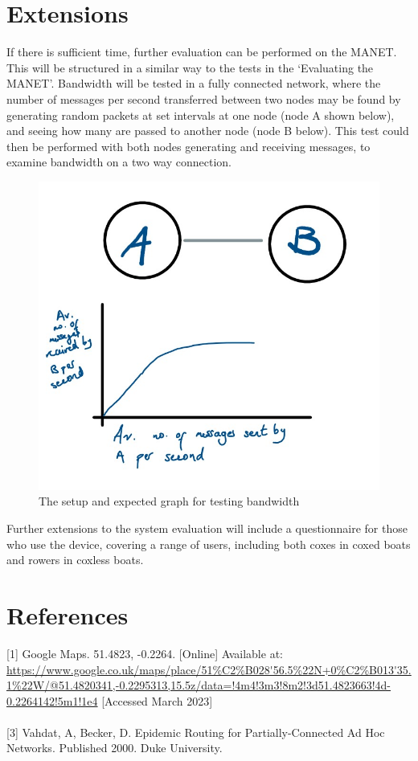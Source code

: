 \documentclass[10pt, a4paper]{article}
\begin{document}
\section*{Extensions}
If there is sufficient time, further evaluation can be performed on the MANET. This will be structured in a similar way to the tests in the `Evaluating the MANET'. Bandwidth will be tested in a fully connected network, where the number of messages per second transferred between two nodes may be found by generating random packets at set intervals at one node (node A shown below), and seeing how many are passed to another node (node B below). 
This test could then be performed with both nodes generating and receiving messages, to examine bandwidth on a two way connection.\\
\begin{figure}[h]
\caption{The setup and expected graph for testing bandwidth}
\begin{center}
\includegraphics[scale=0.3]{bandwidth.jpg}
\end{center}
\end{figure}
Further extensions to the system evaluation will include a questionnaire for those who use the device, covering a range of users, including both coxes in coxed boats and rowers in coxless boats. \\ 

\FloatBarrier
\vspace{10px}
\section*{References}
\label{maps}[1] Google Maps. 51.4823, -0.2264. [Online] Available at: \url{https://www.google.co.uk/maps/place/51%C2%B028'56.5%22N+0%C2%B013'35.1%22W/@51.4820341,-0.2295313,15.5z/data=!4m4!3m3!8m2!3d51.4823663!4d-0.2264142!5m1!1e4} [Accessed March 2023] \\ \\
\label{epidemic}[3] Vahdat, A, Becker, D. Epidemic Routing for Partially-Connected Ad Hoc Networks. Published 2000. Duke University.
\end{document}
